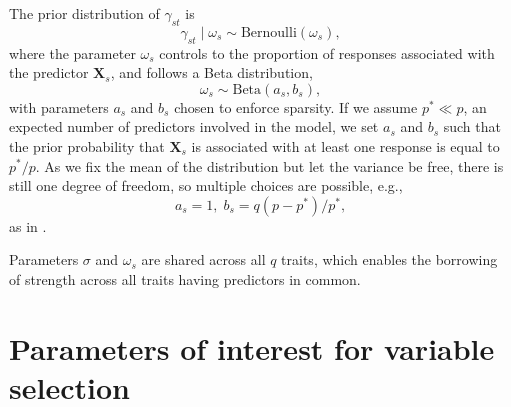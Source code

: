 \documentclass[a4paper, 11pt]{report}
\numberwithin{equation}{chapter}
\begin{document}
The prior distribution of $\gamma_{st}$ is
\begin{equation*}
\gamma_{st} \mid \omega_s \sim  \text{Bernoulli}(\omega_s),
\end{equation*}
where the parameter $\omega_s$ controls to the proportion of responses associated with the predictor $\boldsymbol{X}_s$, and follows a Beta distribution,
\begin{equation*}
\omega_s \sim \text{Beta}(a_s, b_s),
\end{equation*}
with parameters $a_s$ and $b_s$ chosen to enforce sparsity. If we assume $p^* \ll p$, an expected number of predictors involved in the model, we set $a_s$ and $b_s$ such that the prior probability that $\boldsymbol{X}_s$ is associated with at least one response is equal to $p^*/p$. As we fix the mean of the distribution but let the variance be free, there is still one degree of freedom, so multiple choices are possible, e.g.,
\begin{equation*}
a_s = 1,\;b_s = q(p-p^*)/p^*,
\end{equation*}
 as in \citet{bay_lin}.

Parameters $\sigma$ and $\omega_s$ are shared across all $q$ traits, which enables the borrowing of strength across all traits having predictors in common. 

\section{Parameters of interest for variable selection}
\end{document}
